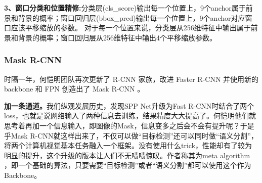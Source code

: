 \textbf{3、窗口分类和位置精修:}分类层(cls\_score)输出每一个位置上，9个anchor属于前景和背景的概率；窗口回归层(bbox\_pred)输出每一个位置上，9个anchor对应窗口应该平移缩放的参数。 对于每一个位置来说，分类层从256维特征中输出属于前景和背景的概率；窗口回归层从256维特征中输出4个平移缩放参数。

\subsubsection{Mask R-CNN}
时隔一年，何恺明团队再次更新了 R-CNN 家族，改进 Faster R-CNN 并使用新的 backbone 和 FPN 创造出了 Mask R-CNN 。

\textbf{加一条通道。}我们纵观发展历史，发现SPP Net升级为Fast R-CNN时结合了两个loss，也就是说网络输入了两种信息去训练，结果精度大大提高了。何恺明他们就思考着再加一个信息输入，即图像的Mask，信息变多之后会不会有提升呢？于是乎Mask R-CNN就这样出来了，不仅可以做“目标检测”还可以同时做“语义分割”，将两个计算机视觉基本任务融入一个框架。没有使用什么trick，性能却有了较为明显的提升，这个升级的版本让人们不无啧啧惊叹。作者称其为meta algorithm ，即一个基础的算法，只要需要“目标检测”或者“语义分割”都可以使用这个作为Backbone。


